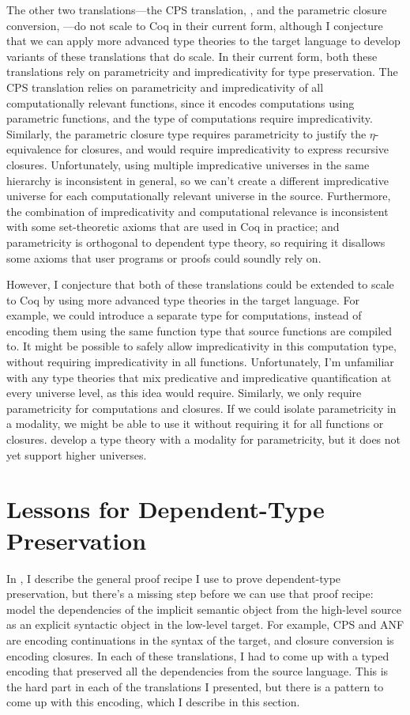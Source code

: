 The other two translations---the CPS translation, , and the
parametric closure conversion, ---do not scale to Coq in
their current form, although I conjecture that we can apply more advanced type
theories to the target language to develop variants of these translations that
do scale.
In their current form, both these translations rely on parametricity and
impredicativity for type preservation.
The CPS translation relies on parametricity and impredicativity of all
computationally relevant functions, since it encodes computations using
parametric functions, and the type of computations require impredicativity.
Similarly, the parametric closure type requires parametricity to justify the
\(\eta\)-equivalence for closures, and would require impredicativity to express
recursive closures.
Unfortunately, using multiple impredicative universes in the same hierarchy
is inconsistent in general, so we can't create a different impredicative
universe for each computationally relevant universe in the source.
Furthermore, the combination of impredicativity and computational relevance is
inconsistent with some set-theoretic axioms that are used in Coq in practice;
and parametricity is orthogonal to dependent type theory, so requiring it
disallows some axioms that user programs or proofs could soundly rely on.

However, I conjecture that both of these translations could be extended to scale
to Coq by using more advanced type theories in the target language.
For example, we could introduce a separate type for computations, instead of
encoding them using the same function type that source functions are compiled to.
It might be possible to safely allow impredicativity in this computation type,
without requiring impredicativity in all functions.
Unfortunately, I'm unfamiliar with any type theories that mix predicative and
impredicative quantification at every universe level, as this idea would
require.
Similarly, we only require parametricity for computations and closures.
If we could isolate parametricity in a modality, we might be able to use it
without requiring it for all functions or closures.
\citet{nuyts2018} develop a type theory with a modality for parametricity, but
it does not yet support higher universes.

\section{Lessons for Dependent-Type Preservation}
In , I describe the general proof recipe I use to prove
dependent-type preservation, but there's a missing step before we can use that
proof recipe: model the dependencies of the implicit semantic object from the
high-level source as an explicit syntactic object in the low-level target.
For example, CPS and ANF are encoding continuations in the syntax of the target,
and closure conversion is encoding closures.
In each of these translations, I had to come up with a typed encoding that
preserved all the dependencies from the source language.
This is the hard part in each of the translations I presented, but there is a
pattern to come up with this encoding, which I describe in this section.

